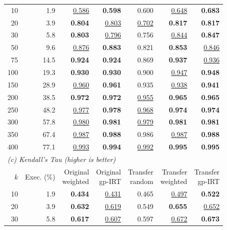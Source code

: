 \begin{table}[t]
\begin{tabular}{rrrrrrr}
    \midrule
    10 & 1.9 & \underline{0.586} & \textbf{0.598} & 0.600 & \underline{0.648} & \textbf{0.683} \\
    20 & 3.9 & \textbf{0.804} & \underline{0.803} & \underline{0.702} & \textbf{0.817} & \textbf{0.817} \\
    30 & 5.8 & \textbf{0.803} & \underline{0.796} & 0.756 & \underline{0.844} & \textbf{0.847} \\
    50 & 9.6 & \underline{0.876} & \textbf{0.883} & 0.821 & \textbf{0.853} & \underline{0.846} \\
    75 & 14.5 & \textbf{0.924} & \textbf{0.924} & 0.869 & \textbf{0.937} & \underline{0.936} \\
    100 & 19.3 & \textbf{0.930} & \textbf{0.930} & 0.900 & \underline{0.947} & \textbf{0.948} \\
    150 & 28.9 & \underline{0.960} & \textbf{0.961} & 0.935 & \underline{0.938} & \textbf{0.941} \\
    200 & 38.5 & \textbf{0.972} & \textbf{0.972} & \underline{0.955} & \textbf{0.965} & \textbf{0.965} \\
    250 & 48.2 & \underline{0.977} & \textbf{0.978} & \underline{0.968} & \textbf{0.974} & \textbf{0.974} \\
    300 & 57.8 & \underline{0.980} & \textbf{0.981} & \underline{0.979} & \textbf{0.981} & \textbf{0.981} \\
    350 & 67.4 & \underline{0.987} & \textbf{0.988} & 0.986 & \underline{0.987} & \textbf{0.988} \\
    400 & 77.1 & \underline{0.993} & \textbf{0.994} & \underline{0.992} & \textbf{0.995} & \textbf{0.995} \\
    \midrule
    \multicolumn{7}{l}{\textit{(c) Kendall's Tau (higher is better)}} \\
    $k$ & Exec. (\%) & \shortstack{Original\\weighted} & \shortstack{Original\\gp-IRT} & \shortstack{Transfer\\random} & \shortstack{Transfer\\weighted} & \shortstack{Transfer\\gp-IRT} \\
    \midrule
    10 & 1.9 & \textbf{0.434} & \underline{0.431} & 0.465 & \underline{0.497} & \textbf{0.522} \\
    20 & 3.9 & \textbf{0.632} & \underline{0.619} & 0.549 & \textbf{0.655} & \underline{0.652} \\
    30 & 5.8 & \textbf{0.617} & \underline{0.607} & 0.597 & \underline{0.672} & \textbf{0.673} \\

\end{tabular}
\end{table}
